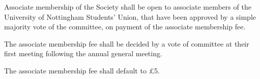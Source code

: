 \begin{clause}  
  Associate membership of the Society shall be open to associate members of the University of Nottingham Students' Union, that have been approved by a simple majority vote of the committee, on payment of the associate membership fee.
\end{clause}

\begin{subclause}
  The associate membership fee shall be decided by a vote of committee at their first meeting following the annual general meeting.
\end{subclause}

\begin{subclause}
  The associate membership fee shall default to \pounds5.
\end{subclause}